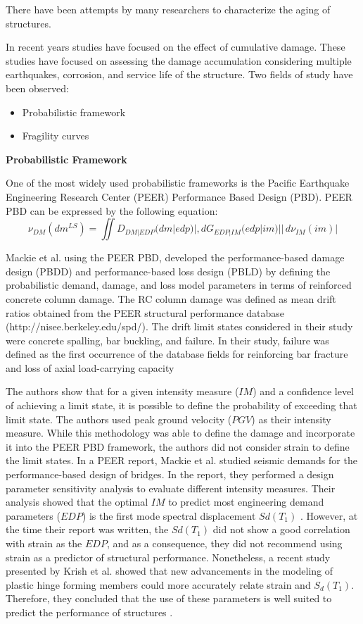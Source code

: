 There have been attempts by many researchers to characterize the aging of structures.

In recent years studies have focused on the effect of cumulative damage. These studies have focused on assessing the damage accumulation considering multiple earthquakes, corrosion, and service life of the structure. Two fields of study have been observed:

\begin{itemize}
	\item Probabilistic framework
	\item Fragility curves
\end{itemize}

\textbf{Probabilistic Framework}

One of the most widely used probabilistic frameworks is the Pacific Earthquake Engineering Research Center (PEER) Performance Based Design (PBD). PEER PBD can be expressed by the following equation:
\begin{equation}
\nu_{DM}(dm^{LS})=\iint D_{DM|EDP}(dm|edp)|,dG_{EDP|IM}(edp|im)||\,d\nu_{IM}(im)|
\end{equation}

Mackie et al. \cite{Mackie2007} using the PEER PBD, developed the performance-based damage design (PBDD) and performance-based loss design (PBLD) by defining the probabilistic demand, damage, and loss model parameters in terms of reinforced concrete column damage. The RC column damage was defined as mean drift ratios obtained from the PEER structural performance database (http://nisee.berkeley.edu/spd/). The drift limit states considered in their study were concrete spalling, bar buckling, and failure. In their study, failure was defined as the first occurrence of the database fields for reinforcing bar fracture and loss of axial load-carrying capacity 

The authors show that for a given intensity measure ($IM$) and a confidence level of achieving a limit state, it is possible to define the probability of exceeding that limit state. The authors used peak ground velocity ($PGV$) as their intensity measure. While this methodology was able to define the damage and incorporate it into the PEER PBD framework, the authors did not consider strain to define the limit states. In a PEER report, Mackie et al. studied seismic demands for the performance-based design of bridges. In the report, they performed a design parameter sensitivity analysis to evaluate different intensity measures. Their analysis showed that the optimal $IM$ to predict most engineering demand parameters ($EDP$) is the first mode spectral displacement $Sd(T_{1})$  \cite{Mackie2003}. However, at the time their report was written, the $Sd(T_{1})$ did not show a good correlation with strain as the $EDP$, and as a consequence, they did not recommend using strain as a predictor of structural performance. Nonetheless, a recent study presented by Krish et al. showed that new advancements in the modeling of plastic hinge forming members could more accurately relate strain and $S_{d}(T_{1})$. Therefore, they concluded that the use of these parameters is well suited to predict the performance of structures \cite{Krish2018}.

